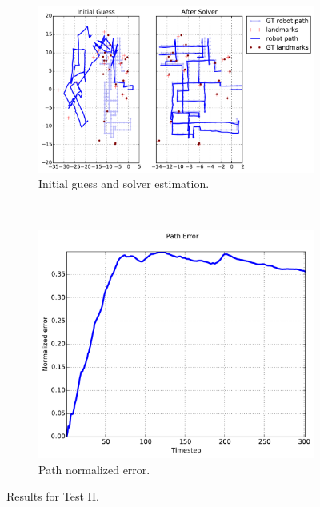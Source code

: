 \begin{figure}[htbp!]
    \centering
    \begin{subfigure}[b]{\estWidth\textwidth}
        \includegraphics[width=\textwidth]{imagenes/tests/known/res_it_20_nl_40_op_100_oa_100_lp_100_ds_300_kw_1.pdf}
        \caption{Initial guess and solver estimation.}
        \label{fig:test-iia}
    \end{subfigure}\\
    \begin{subfigure}[b]{\errorWidth\textwidth}
        \includegraphics[width=\textwidth]{imagenes/tests/known/res_it_20_nl_40_op_100_oa_100_lp_100_ds_300_kw_1_path.pdf}
        \caption{Path normalized error.}
        \label{fig:test-iib}
    \end{subfigure}
    \caption{Results for Test II.}
    \label{fig:test-ii}
\end{figure}
\clearpage

